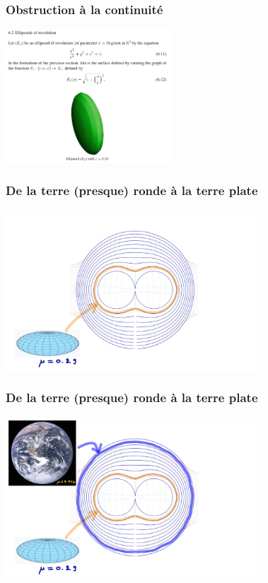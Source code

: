 \documentclass[9pt]{beamer}
\begin{document}
\begin{frame}
\frametitle{\bf Obstruction à la continuité}
 
\centering \includegraphics[height=5.0cm]{figal2}

\end{frame}

\begin{frame}
\frametitle{\bf De la terre (presque) ronde à la terre plate}
 
\centering \includegraphics[height=6.0cm]{oblat1}

\end{frame}

\begin{frame}
\frametitle{\bf De la terre (presque) ronde à la terre plate}
 
\centering \includegraphics[height=6.0cm]{oblat2}

\end{frame}
\end{document}
